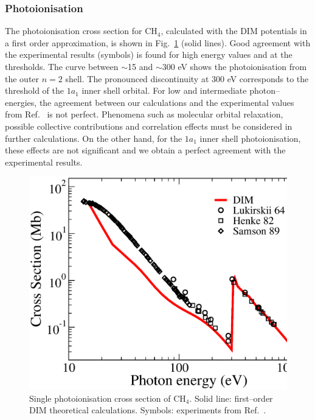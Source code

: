\documentclass[10pt]{article}
\begin{document}
\subsubsection{Photoionisation}
\label{subsubsec:photoionisation}

The photoionisation cross section for CH$_4$, calculated with the DIM 
potentials in a first order approximation, is shown in 
Fig.~\ref{fig:photoch4} (solid lines).
Good agreement with the experimental results (symbols) is found for 
high energy values and at the thresholds. The curve between $\sim$15 and
$\sim$300 eV shows the photoionisation from the outer $n=2$ shell. 
The pronounced discontinuity at 300 eV corresponds to the threshold of
the $1a_1$ inner shell orbital. For low and intermediate photon--energies,
the agreement between our calculations and the experimental values 
from Ref.~\cite{Lukirskii1964,Henke1982,Samson1989} is not perfect.
Phenomena such as molecular orbital relaxation, possible 
collective contributions and correlation effects must be considered 
in further calculations. On the other hand, for the $1a_1$ inner shell
photoionisation, these effects are not significant and we obtain a 
perfect agreement with the experimental results.
\begin{figure}[H]
\centering
\includegraphics[height=0.23\textheight]{figures/dimpot/photoch4.eps}
\caption{Single photoionisation cross section of CH$_4$.
Solid line: first--order DIM theoretical calculations. Symbols: experiments
from Ref.~\cite{Lukirskii1964,Henke1982,Samson1989}.}
\label{fig:photoch4}
\end{figure}
\end{document}
